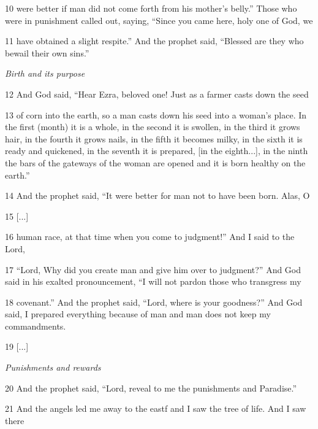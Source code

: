 \par 10 were better if man did not come forth from his mother's belly.” Those who were in punishment called out, saying, “Since you came here, holy one of God, we

\par 11 have obtained a slight respite.” And the prophet said, “Blessed are they who bewail their own sins.”

\par \textit{Birth and its purpose}

\par 12 And God said, “Hear Ezra, beloved one! Just as a farmer casts down the seed

\par 13 of corn into the earth, so a man casts down his seed into a woman's place. In the first (month) it is a whole, in the second it is swollen, in the third it grows hair, in the fourth it grows nails, in the fifth it becomes milky, in the sixth it is ready and quickened, in the seventh it is prepared, [in the eighth...], in the ninth the bars of the gateways of the woman are opened and it is born healthy on the earth.”

\par 14 And the prophet said, “It were better for man not to have been born. Alas, O

\par 15 [...]

\par 16 human race, at that time when you come to judgment!” And I said to the Lord,

\par 17 “Lord, Why did you create man and give him over to judgment?” And God said in his exalted pronouncement, “I will not pardon those who transgress my

\par 18 covenant.” And the prophet said, “Lord, where is your goodness?” And God said, I prepared everything because of man and man does not keep my commandments.

\par 19 [...]

\par \textit{Punishments and rewards}

\par 20 And the prophet said, “Lord, reveal to me the punishments and Paradise.”

\par 21 And the angels led me away to the eastf and I saw the tree of life. And I saw there 

